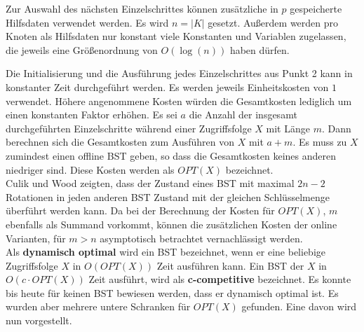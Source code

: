 \documentclass[a4paper,12pt]{article}
\begin{document}
\noindent 	Zur Auswahl des nächsten Einzelschrittes können zusätzliche in $p$ gespeicherte Hilfsdaten verwendet werden. Es wird $n = \vert K \vert$ gesetzt. Außerdem werden pro Knoten als Hilfsdaten nur konstant viele Konstanten und Variablen zugelassen, die jeweils eine Größenordnung von $O\left(\log \left(n\right)\right)$  haben dürfen.

\noindent Die Initialisierung und die Ausführung jedes Einzelschrittes aus Punkt 2 kann in konstanter Zeit durchgeführt werden. Es werden jeweils Einheitskosten von $1$ verwendet. Höhere angenommene Kosten würden die Gesamtkosten lediglich um einen konstanten Faktor erhöhen. Es sei $a$ die Anzahl der insgesamt durchgeführten Einzelschritte während einer Zugriffsfolge $X$ mit Länge $m$. Dann berechnen sich die Gesamtkosten zum Ausführen von $X$ mit $a + m$. Es muss zu $X$ zumindest einen offline BST geben, so dass die Gesamtkosten keines anderen niedriger sind. Diese Kosten werden als \textbf{$\mathit{OPT\left(X\right)}$} bezeichnet.\\  Culik und Wood \cite{nRotations} zeigten, dass der Zustand eines BST mit maximal $2n -2$ Rotationen in jeden anderen BST Zustand mit der gleichen Schlüsselmenge überführt werden kann. Da bei der Berechnung der Kosten für  $\mathit{OPT(X)}$, $m$ ebenfalls als Summand vorkommt, können die zusätzlichen Kosten der online Varianten, für $m > n$ asymptotisch betrachtet vernachlässigt werden. \\
\noindent Als \textbf{dynamisch optimal } wird ein BST bezeichnet, wenn er eine beliebige Zugriffsfolge $X$ in $O\left(\mathit{OPT}\left(X\right)\right)$ Zeit ausführen kann. Ein BST der $X$ in $O\left(c \cdot \mathit{OPT}\left(X\right)\right)$ Zeit ausführt, wird als \textbf{c-competitive} bezeichnet. Es konnte bis heute für keinen BST bewiesen werden, dass er dynamisch optimal ist. Es wurden aber mehrere untere Schranken für $\mathit{OPT}\left(X\right)$ gefunden. Eine davon wird  nun vorgestellt.
\end{document}
